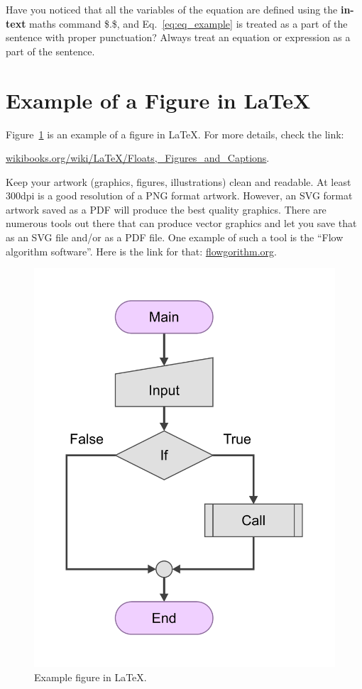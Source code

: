 Have you noticed that all the variables of the equation are defined using the \textbf{in-text} maths command \$.\$, and Eq.~\eqref{eq:eq_example} is treated as a part of the sentence with proper punctuation? Always treat an equation or expression as a part of the sentence. 

\section{Example of a Figure in \LaTeX}
Figure~\ref{fig:chart_a} is an example of a figure in \LaTeX. For more details, check the link:

\href{https://en.wikibooks.org/wiki/LaTeX/Floats,_Figures_and_Captions}{wikibooks.org/wiki/LaTeX/Floats,\_Figures\_and\_Captions}.

\noindent
Keep your artwork (graphics, figures, illustrations) clean and readable. At least 300dpi is a good resolution of a PNG format artwork. However, an SVG format artwork saved as a PDF will produce the best quality graphics. There are numerous tools out there that can produce vector graphics and let you save that as an SVG file and/or as a PDF file. One example of such a tool is the ``Flow algorithm software''. Here is the link for that: \href{http://www.flowgorithm.org/download/}{flowgorithm.org}.
\begin{figure}[ht]
    \centering
    \includegraphics[scale=0.3]{figures/chart.pdf}
    \caption{Example figure in \LaTeX.}
    \label{fig:chart_a}
\end{figure}

